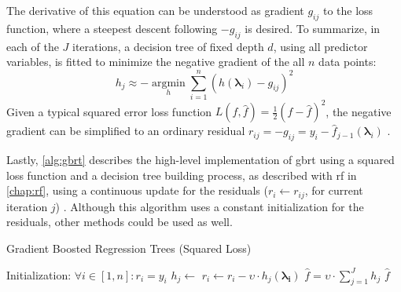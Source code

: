 The derivative of this equation can be understood as gradient $g_{ij}$ to the loss function, where a steepest descent following $-g_{ij}$ is desired. To summarize, in each of the $J$ iterations, a decision tree of fixed depth $d$, using all predictor variables, is fitted to minimize the negative gradient of the all $n$ data points:
\begin{equation}
	h_j \approx -\operatorname*{argmin}_{h} \sum_{i=1}^{n} (h(\mathbf{\lambda}_i) - g_{ij})^2
\end{equation}
Given a typical squared error loss function $L(f, \hat{f}) = \frac{1}{2}(f - \hat{f})^2$, the negative gradient can be simplified to an ordinary residual $r_{ij} = -g_{ij} = y_i - \hat{f}_{j-1}(\mathbf{\lambda}_i)$ \cite[Chapter~10]{hastie2009elements}.

Lastly, \cref{alg:gbrt} describes the high-level implementation of \gls{gbrt} using a squared loss function and a decision tree building process, as described with \gls{rf} in \cref{chap:rf}, using a continuous update for the residuals ($r_{i} \gets r_{ij}$, for current iteration $j$) \cite{mohan2011web}.
Although this algorithm uses a constant initialization for the residuals, other methods could be used as well.

\begin{algorithm}
	\caption{Gradient Boosted Regression Trees (Squared Loss)}
	\label{alg:gbrt}
	\begin{algorithmic}
		\State Initialization: $\forall i \in [1,n]: r_i = y_i$
			\State$h_j \gets$ 
				\State $r_i \gets r_i - \upsilon \cdot h_j(\mathbf{\lambda_i})$
			\EndFor
		\EndFor
		\State $\hat{f} = \upsilon \cdot \sum_{j=1}^{J} h_j$
		\State \Return $\hat{f}$
	\end{algorithmic}
\end{algorithm}

